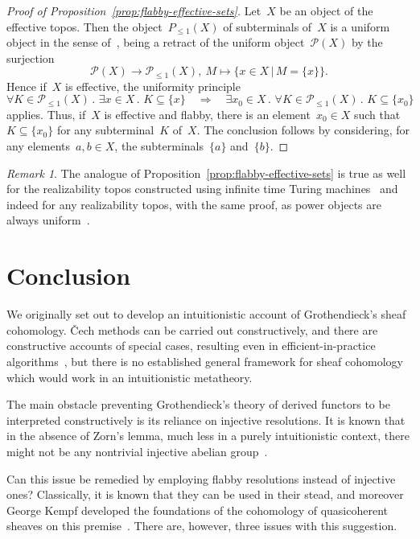 \documentclass[oneside]{amsart}
\theoremstyle{definition}
\theoremstyle{plain}
\theoremstyle{remark}
\newtheorem{rem}[defn]{Remark}
\renewcommand{\P}{\mathcal{P}}
\renewcommand{\_}{\mathpunct{.}\,}
\newcommand{\effective}{ef{}fective\xspace}
\begin{document}
\begin{proof}[Proof of Proposition~\ref{prop:flabby-effective-sets}]
Let~$X$ be an object of the \effective topos. Then the object~$P_{\leq1}(X)$ of
subterminals of~$X$ is a uniform object in the sense
of~\cite[Section~3.4]{moerdijk-oosten:topos-theory}, being a retract of the
uniform object~$\P(X)$ by the surjection
\[ \P(X) \longrightarrow \P_{\leq1}(X),\
  M \longmapsto \{ x \in X \,|\, M = \{ x \} \}. \]
Hence if~$X$ is \effective, the uniformity principle~\cite[Proposition~15.1]{hyland:effective-topos}
\[ \forall K \in \P_{\leq1}(X)\_
  \exists x \in X\_ K \subseteq \{x\} \quad\Longrightarrow\quad
  \exists x_0 \in X\_ \forall K \in \P_{\leq1}(X)\_ K \subseteq \{x_0\} \]
applies. Thus, if~$X$ is \effective and flabby, there is
an element~$x_0 \in X$ such that~$K \subseteq \{x_0\}$ for any subterminal~$K$
of~$X$. The conclusion follows by considering, for any elements~$a,b \in X$,
the subterminals~$\{a\}$ and~$\{b\}$.
\end{proof}

\begin{rem}The analogue of Proposition~\ref{prop:flabby-effective-sets} is true
as well for the realizability topos constructed using infinite time Turing
machines~\cite{bauer:injection,hamkins-lewis:ittm} and indeed for any
realizability topos, with the same proof, as power objects are always
uniform~\cite{johnstone:review-oosten}.\end{rem}


\section{Conclusion}
\label{sect:conclusion}

We originally set out to develop an intuitionistic account of Grothendieck's
sheaf cohomology. Čech methods can be carried out constructively, and
there are constructive accounts of special cases, resulting even in
efficient-in-practice algorithms~\cite{barakat-lh:homalg,barakat-lh:ext},
but there is no established general framework for sheaf
cohomology which would work in an intuitionistic metatheory.

The main obstacle preventing Grothendieck's theory of derived functors to be interpreted
constructively is its reliance on injective resolutions. It is known that in
the absence of Zorn's lemma, much less in a purely intuitionistic
context, there might not be any nontrivial injective abelian
group~\cite{blass:inj-proj-axc}.

Can this issue be remedied by employing flabby resolutions
instead of injective ones? Classically, it is known that they can be used in
their stead, and moreover George Kempf developed the foundations of the
cohomology of quasicoherent sheaves on this premise~\cite{kempf:cohomology}. There are, however, three issues with this
suggestion.
\end{document}
